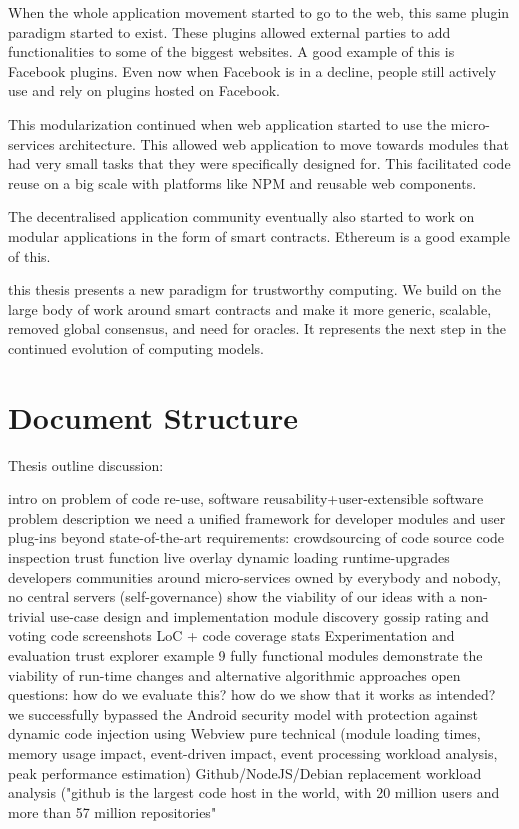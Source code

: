 When the whole application movement started to go to the web, this same plugin paradigm started to exist. These plugins allowed external parties to add functionalities to some of the biggest websites. A good example of this is Facebook plugins. Even now when Facebook is in a decline, people still actively use and rely on plugins hosted on Facebook.

This modularization continued when web application started to use the micro-services architecture. This allowed web application to move towards modules that had very small tasks that they were specifically designed for. This facilitated code reuse on a big scale with platforms like NPM and reusable web components.

The decentralised application community eventually also started to work on modular applications in the form of smart contracts. Ethereum is a good example of this.

this thesis presents a new paradigm for trustworthy computing. We build on the large body of work around smart contracts and make it more generic, scalable, removed global consensus, and need for oracles. It represents the next step in the continued evolution of computing models.

\section{Document Structure}

Thesis outline discussion:

intro on problem of code re-use, software reusability+user-extensible software
problem description
we need a unified framework for developer modules and user plug-ins
beyond state-of-the-art requirements:
crowdsourcing of code
source code inspection
trust function
live overlay
dynamic loading
runtime-upgrades
developers communities around micro-services
owned by everybody and nobody, no central servers (self-governance)
show the viability of our ideas with a non-trivial use-case
design and implementation
module discovery gossip
rating and voting
code screenshots
LoC + code coverage stats
Experimentation and evaluation
trust explorer example
9 fully functional modules
demonstrate the viability of run-time changes and alternative algorithmic approaches
open questions:
how do we evaluate this?
how do we show that it works as intended?
we successfully bypassed the Android security model with protection against dynamic code injection using Webview
pure technical (module loading times, memory usage impact, event-driven impact, event processing workload analysis, peak performance estimation)
Github/NodeJS/Debian replacement workload analysis ("github is the largest code host in the world, with 20 million users and more than 57 million repositories"